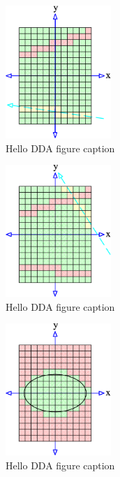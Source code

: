 	\begin{figure}
	  \centering
	  \includegraphics[width=4cm]{Space_Carving_2.png}
	  \caption{Hello DDA figure caption }\label{fig:SC-two-figsA}
	\end{figure}
	\begin{figure}
	  \centering
	  \includegraphics[width=4cm]{Space_Carving_3.png}
	  \caption{Hello DDA figure caption}\label{fig:SC-three-figsA}
	\end{figure}
	\begin{figure}
	  \centering
	  \includegraphics[width=4cm]{Space_Carving_4.png}
	  \caption{Hello DDA figure caption}\label{fig:SC-four-figsA}
	\end{figure}
